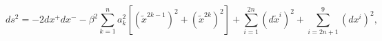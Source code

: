 \begin{equation}
\label{genppM}
ds^2 = -2 dx^+ dx^-
- \beta^2 \sum_{k=1}^n a_k^2 \left[ (\tilde{x}^{2k-1})^2 +
(\tilde{x}^{2k})^2 \right]
+ \sum_{i=1}^{2n} (d\tilde{x}^i)^2 
+ \sum_{i=2n+1}^9 (dx^i)^2, 
\end{equation}

